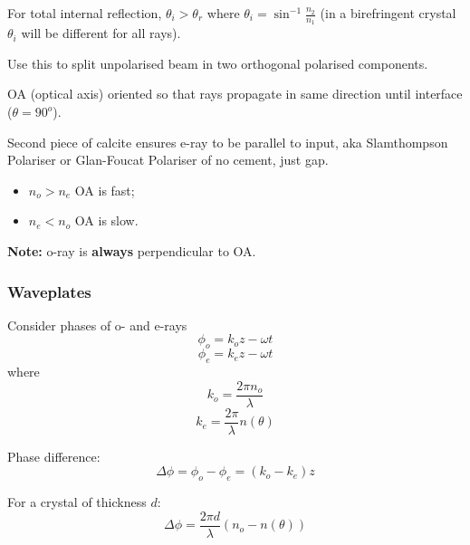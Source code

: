 \documentclass[10pt]{article}
\begin{document}
For total internal reflection, $\theta_i > \theta_r$ where $\theta_i = \sin^{-1}{\frac{n_2}{n_1}}$ (in a birefringent crystal $\theta_i$ will be different for all rays).

Use this to split unpolarised beam in two orthogonal polarised components.

OA (optical axis) oriented so that rays propagate in same direction until interface ($\theta = 90^o$).

Second piece of calcite ensures e-ray to be parallel to input, aka Slamthompson Polariser or Glan-Foucat Polariser of no cement, just gap.

\begin{itemize}
\item[$\bullet$] $n_o > n_e$ OA is fast;
\item[$\bullet$] $n_e < n_o$ OA is slow.
\end{itemize}
\textbf{Note:} o-ray is \textbf{always} perpendicular to OA.

\subsubsection{Waveplates}
Consider phases of o- and e-rays
\begin{equation*}
\phi_o = k_o z - \omega t
\end{equation*}
\begin{equation*}
\phi_e = k_e z - \omega t
\end{equation*}
where
\begin{equation*}
k_o = \frac{2 \pi n_o}{\lambda}
\end{equation*}
\begin{equation*}
k_e = \frac{2 \pi}{\lambda}n(\theta)
\end{equation*}

Phase difference:
\begin{equation*}
\Delta\phi = \phi_o - \phi_e = (k_o - k_e)z
\end{equation*}

For a crystal of thickness $d$:
\begin{equation*}
\Delta\phi = \frac{2 \pi d}{\lambda}(n_o - n(\theta))
\end{equation*}
\end{document}
